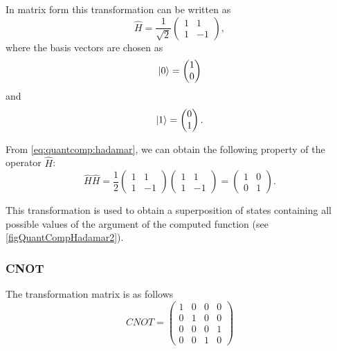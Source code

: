 In matrix form this transformation can be written as
\begin{equation}
\hat{H} = \frac{1}{\sqrt{2}}
\begin{pmatrix}
1 & 1 \\
1 & -1
\end{pmatrix},
\label{eq:quantcomp:hadamar}
\end{equation}
where the basis vectors are chosen as
\[
\ket{0} = \begin{pmatrix}
1 \\ 0 
\end{pmatrix}
\]
and
\[
\ket{1} = \begin{pmatrix}
0 \\ 1 
\end{pmatrix}.
\]



From \eqref{eq:quantcomp:hadamar}, we can obtain the following property of the operator $\hat{H}$:
\begin{equation}
\hat{H} \hat{H} = \frac{1}{2}
\begin{pmatrix}
1 & 1 \\
1 & -1
\end{pmatrix}
\begin{pmatrix}
1 & 1 \\
1 & -1
\end{pmatrix} = 
\begin{pmatrix}
1 & 0 \\
0 & 1
\end{pmatrix}.
\label{eq:quantcomp:hadamar_prop}
\end{equation}

This transformation is used to obtain a superposition of states containing all possible values of the argument of the computed function (see \autoref{figQuantCompHadamar2}).



\subsubsection{CNOT}

The transformation matrix is as follows
\[
CNOT=\begin{pmatrix}
1 & 0 & 0 & 0 \\
0 & 1 & 0 & 0 \\
0 & 0 & 0 & 1 \\
0 & 0 & 1 & 0 
\end{pmatrix}
\]

